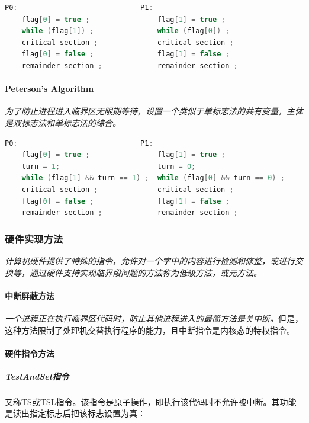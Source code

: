 \begin{lstlisting}[language=C++]
P0:                             P1:
    flag[0] = true ;                flag[1] = true ;
    while (flag[1]) ;               while (flag[0]) ;
    critical section ;              critical section ;
    flag[0] = false ;               flag[1] = false ;
    remainder section ;             remainder section ;   
\end{lstlisting}

\paragraph{Peterson's Algorithm} 

    \emph{为了防止进程进入临界区无限期等待，设置一个类似于单标志法的共有变量，主体是双标志法和单标志法的综合。}

\begin{lstlisting}[language=C++]
P0:                             P1:
    flag[0] = true ;                flag[1] = true ;
    turn = 1;                       turn = 0;
    while (flag[1] && turn == 1) ;  while (flag[0] && turn == 0) ;
    critical section ;              critical section ;
    flag[0] = false ;               flag[1] = false ;
    remainder section ;             remainder section ;     
\end{lstlisting}

\subsubsection{硬件实现方法}

    \emph{计算机硬件提供了特殊的指令，允许对一个字中的内容进行检测和修整，或进行交换等，通过硬件支持实现临界段问题的方法称为低级方法，或元方法。}

\paragraph{中断屏蔽方法}

    \emph{一个进程正在执行临界区代码时，防止其他进程进入的最简方法是关中断。}但是，这种方法限制了处理机交替执行程序的能力，且中断指令是内核态的特权指令。

\paragraph{硬件指令方法}

\subparagraph{TestAndSet指令}

    又称TS或TSL指令。该指令是原子操作，即执行该代码时不允许被中断。其功能是读出指定标志后把该标志设置为真：

